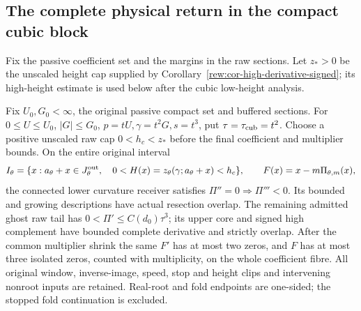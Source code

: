 \subsection{The complete physical return in the compact cubic block}

Fix the passive coefficient set and the margins in the raw sections.
Let \(z_*>0\) be the
unscaled height cap supplied by Corollary~\ref{rew:cor-high-derivative-signed};
its high-height estimate is used below after the cubic low-height analysis.

\begin{proposition}
\label{deg:prop-compact-cubic}
Fix \(U_0,G_0<\infty\), the original passive compact set and buffered
sections. For \(0\le U\le U_0\), \(|G|\le G_0\),
\(p=tU,\gamma=t^2G,s=t^3\), put \(\tau=\tau_{\rm cub}=t^2\).
Choose a positive unscaled raw cap \(0<h_c<z_*\) before the final
coefficient and multiplier bounds. On the entire original interval
\[
 I_\theta=\{x:a_\theta+x\in J_\theta^{\rm out},\quad
                 0<H(x)=z_\theta(\gamma;a_\theta+x)<h_c\},
 \qquad F(x)=x-m\Pi_{\theta,m}(x),
\]
the connected lower curvature receiver satisfies
\(\Pi''=0\Rightarrow\Pi'''<0\). Its bounded and growing descriptions
have actual resection overlap. The remaining admitted ghost raw tail has
\(0<\Pi'\le C(d_0)\tau^3\); its upper core and signed high complement
have bounded complete derivative and strictly overlap. After the common
multiplier shrink the same \(F'\) has at most two zeros, and \(F\)
has at most three isolated zeros, counted with multiplicity, on the whole
coefficient fibre. All original window, inverse-image, speed, stop and
height clips and intervening nonroot inputs are retained. Real-root and
fold endpoints are one-sided; the stopped fold continuation is excluded.
\end{proposition}


